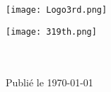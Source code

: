 \thispagestyle{empty}

\begin{center}
	\null
	
	\vfil
	
	\texttt{[image: Logo3rd.png]}
	
	\vfil
	
	
	\vfil
	
	\begin{minipage}{\textwidth}
		\centering
		\texttt{[image: 319th.png]}\\[1ex]
		{\Large \rgt{}}\\[1ex]
		{\Large \inmem{}}
	\end{minipage}
	
%	
	
	\vfil
	
	
	
	
	
	
	
	\vfil
	
	\begin{minipage}{\textwidth}
		\centering
		{\large \version }\\ %
		{\large Publié le \today}%
	\end{minipage}
	
\end{center}